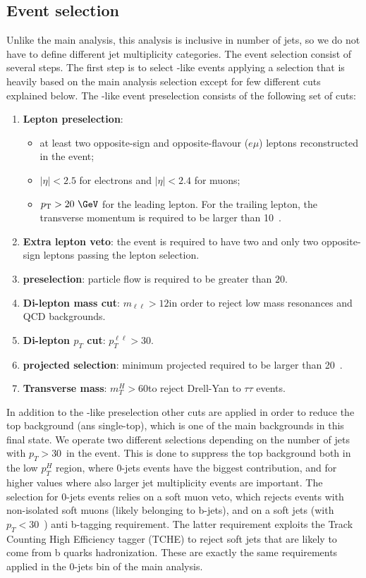	\subsection{Event selection\label{subsec:EventSelection}}
Unlike the main \hwwllnn analysis, this analysis is inclusive in number of jets, so we do not have to define different jet multiplicity categories.
The event selection consist of several steps. The first step is to select \WW -like events applying a selection that is heavily based on the main analysis selection except for few different cuts explained below.
The \WW -like event preselection consists of the following set of cuts:
\begin{enumerate}
\item {\bf Lepton preselection}:
  \begin{itemize}
  \item at least two opposite-sign and opposite-flavour ($e\mu$) leptons reconstructed in the event;
  \item $|\eta|<2.5$ for electrons and $|\eta|<2.4$ for muons;
  \item $\pt>20~\GeV$ for the leading lepton. For the trailing lepton, the transverse momentum is required to be larger than 10~\GeV.
  \end{itemize}
\item {\bf Extra lepton veto}: the event is required to have two and only two opposite-sign leptons passing the lepton selection.
\item {\bf \MET preselection}: particle flow \MET is required to be greater than $20$\GeV.
\item {\bf Di-lepton mass cut}: $m_{\ell\ell} > 12$\GeV in order to reject low mass resonances and QCD backgrounds.
\item {\bf Di-lepton $p_T$ cut}: $p_T^{\ell\ell} > 30$\GeV.
\item {\bf projected \MET selection}: minimum projected \MET required to be larger than 20~\GeV.
\item {\bf Transverse mass}: $m_T^H>60$\GeV to reject Drell-Yan to $\tau\tau$ events. 
\end{enumerate}
In addition to the \WW-like preselection other cuts are applied in order to reduce the top background (\ttbar ans single-top), which is one of the main backgrounds in this final state. We operate two different selections depending on the number of jets with $p_T > 30$~\GeV in the event. This is done to suppress the top background both in the low $p_T^H$ region, where 0-jets events have the biggest contribution, and for higher values where also larger jet multiplicity events are important.
The selection for 0-jets events relies on a soft muon veto, which rejects events with non-isolated soft muons (likely belonging to b-jets), and on a soft jets (with $p_T < 30$~\GeV) anti b-tagging requirement.
The latter requirement exploits the Track Counting High Efficiency tagger (TCHE) to reject soft jets that are likely to come from b quarks hadronization.
These are exactly the same requirements applied in the 0-jets bin of the main analysis.

